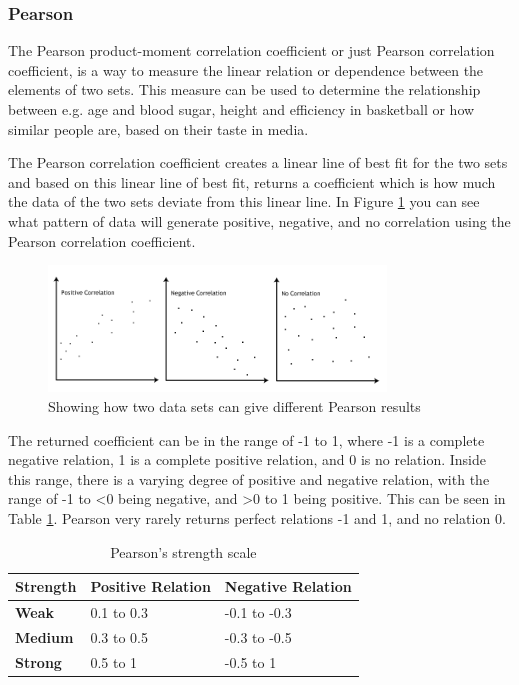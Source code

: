 \subsubsection{Pearson}

The Pearson product-moment correlation coefficient or just Pearson correlation coefficient, is a way to measure the linear relation or dependence between the elements of two sets. This measure can be used to determine the relationship between e.g. age and blood sugar, height and efficiency in basketball or how similar people are, based on their taste in media. \cite{Pearson2}

The Pearson correlation coefficient creates a linear line of best fit for the two sets and based on this linear line of best fit, returns a coefficient which is how much the data of the two sets deviate from this linear line. In Figure \ref{Pearson2} you can see what pattern of data will generate positive, negative, and no correlation using the Pearson correlation coefficient. \cite{Pearson2}

\begin{figure}[H]
\centering
\includegraphics[width=0.8\textwidth]{Images/pearson2.png}
\caption{Showing how two data sets can give different Pearson results \cite{Pearson2}}
\label{Pearson2}
\end{figure}

The returned coefficient can be in the range of -1 to 1, where -1 is a complete negative relation, 1 is a complete positive relation, and 0 is no relation. Inside this range, there is a varying degree of positive and negative relation, with the range of -1 to <0 being negative, and >0 to 1 being positive. This can be seen in Table \ref{PearsonStr}. Pearson very rarely returns perfect relations -1 and 1, and no relation 0. \cite{Pearson2}

\begin{table}[htb]
\centering
\begin{tabular}{|l|l|l|} \hline
	\textbf{Strength} & \textbf{Positive Relation} & \textbf{Negative Relation} \\ \hline
	\textbf{Weak} & 0.1 to 0.3 & -0.1 to -0.3 \\ \hline
	\textbf{Medium} & 0.3 to 0.5 & -0.3 to -0.5 \\ \hline
	\textbf{Strong} & 0.5 to 1 & -0.5 to 1 \\ \hline
\end{tabular}
\caption{Pearson's strength scale \cite{Pearson2}}
\label{PearsonStr}
\end{table}

